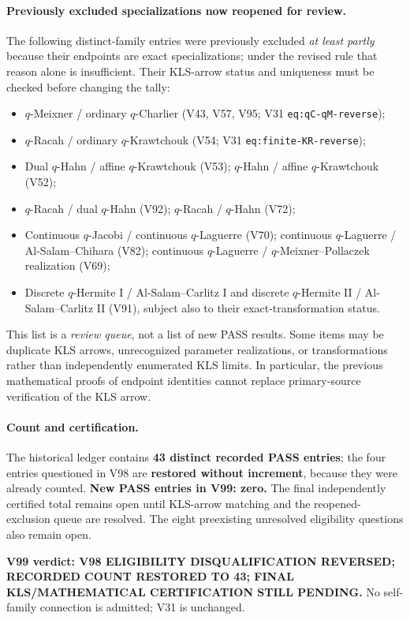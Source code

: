 \documentclass[11pt]{article}
\begin{document}
\paragraph{Previously excluded specializations now reopened for review.} The following distinct-family entries were previously excluded \emph{at least partly} because their endpoints are exact specializations; under the revised rule that reason alone is insufficient. Their KLS-arrow status and uniqueness must be checked before changing the tally:
\begin{itemize}
\item $q$-Meixner / ordinary $q$-Charlier (V43, V57, V95; V31 \texttt{eq:qC-qM-reverse});
\item $q$-Racah / ordinary $q$-Krawtchouk (V54; V31 \texttt{eq:finite-KR-reverse});
\item Dual $q$-Hahn / affine $q$-Krawtchouk (V53); $q$-Hahn / affine $q$-Krawtchouk (V52);
\item $q$-Racah / dual $q$-Hahn (V92); $q$-Racah / $q$-Hahn (V72);
\item Continuous $q$-Jacobi / continuous $q$-Laguerre (V70); continuous $q$-Laguerre / Al-Salam--Chihara (V82); continuous $q$-Laguerre / $q$-Meixner--Pollaczek realization (V69);
\item Discrete $q$-Hermite I / Al-Salam--Carlitz I and discrete $q$-Hermite II / Al-Salam--Carlitz II (V91), subject also to their exact-transformation status.
\end{itemize}
This list is a \emph{review queue}, not a list of new PASS results. Some items may be duplicate KLS arrows, unrecognized parameter realizations, or transformations rather than independently enumerated KLS limits. In particular, the previous mathematical proofs of endpoint identities cannot replace primary-source verification of the KLS arrow.

\paragraph{Count and certification.} The historical ledger contains \textbf{43 distinct recorded PASS entries}; the four entries questioned in V98 are \textbf{restored without increment}, because they were already counted. \textbf{New PASS entries in V99: zero.} The final independently certified total remains open until KLS-arrow matching and the reopened-exclusion queue are resolved. The eight preexisting unresolved eligibility questions also remain open.

\noindent\textbf{V99 verdict: V98 ELIGIBILITY DISQUALIFICATION REVERSED; RECORDED COUNT RESTORED TO 43; FINAL KLS/MATHEMATICAL CERTIFICATION STILL PENDING.} No self-family connection is admitted; V31 is unchanged.
\end{document}
